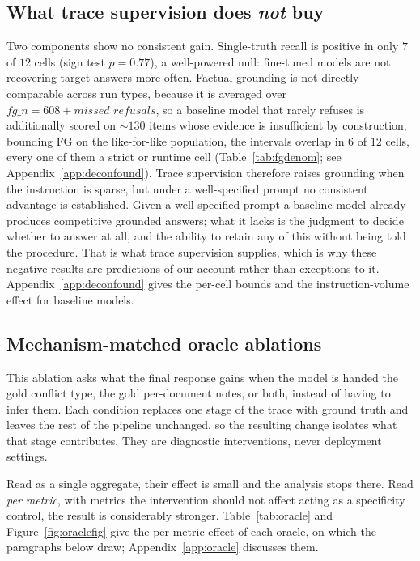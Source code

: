 \subsection{What trace supervision does \emph{not} buy}
\label{sec:whatdoesnot}

Two components show no consistent gain. Single-truth recall is positive in only
$7$ of $12$ cells (sign test $p=0.77$), a well-powered null: fine-tuned models
are not recovering target answers more often. Factual grounding is not directly
comparable across run types, because it is averaged over
$\textit{fg\_n}=608+\textit{missed refusals}$, so a baseline model that rarely
refuses is additionally scored on ${\sim}130$ items whose evidence is
insufficient by construction; bounding FG on the like-for-like population, the
intervals overlap in $6$ of $12$ cells, every one of them a strict or runtime
cell (Table~\ref{tab:fgdenom}; see Appendix~\ref{app:deconfound}). Trace supervision
therefore raises grounding when the instruction is sparse, but under a
well-specified prompt no consistent advantage is established. Given a
well-specified prompt a baseline model already produces competitive grounded
answers; what it lacks is the judgment to decide whether to answer at all, and
the ability to retain any of this without being told the procedure. That is what
trace supervision supplies, which is why these negative results are predictions
of our account rather than exceptions to it.
Appendix~\ref{app:deconfound} gives the per-cell bounds and the
instruction-volume effect for baseline models.

\subsection{Mechanism-matched oracle ablations}
\label{sec:oracle}

This ablation asks what the final response gains when the model is handed the
gold conflict type, the gold per-document notes, or both, instead of having to
infer them. Each condition replaces one stage of the trace with ground truth
and leaves the rest of the pipeline unchanged, so the resulting change isolates
what that stage contributes. They are diagnostic interventions, never
deployment settings.

Read as a single aggregate, their effect is small and the analysis stops there.
Read \emph{per metric}, with metrics the intervention should not affect acting
as a specificity control, the result is considerably stronger. Table~\ref{tab:oracle} and
Figure~\ref{fig:oraclefig} give the per-metric effect of each oracle, on which
the paragraphs below draw; Appendix~\ref{app:oracle} discusses them.

